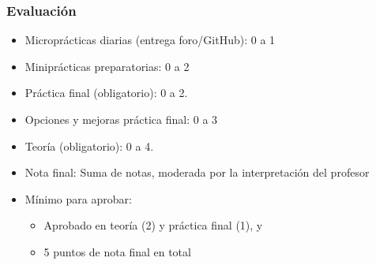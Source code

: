 
\begin{frame}
\frametitle{Evaluación}

\begin{itemize}
\item Microprácticas diarias (entrega foro/GitHub): 0 a 1
\item Miniprácticas preparatorias: 0 a 2
\item Práctica final (obligatorio): 0 a 2.
\item Opciones y mejoras práctica final: 0 a 3
\item Teoría (obligatorio): 0 a 4.
\item Nota final: Suma de notas, moderada por la interpretación del profesor
\item Mínimo para aprobar:
      \begin{itemize}
      \item Aprobado en teoría (2) y práctica final (1), y
      \item 5 puntos de nota final en total
      \end{itemize}
\end{itemize}

\end{frame}


